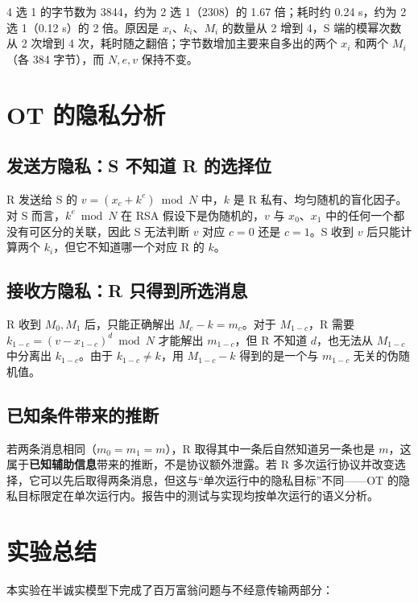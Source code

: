 \documentclass{SYSUReport}
\begin{document}
4 选 1 的字节数为 3844，约为 2 选 1（2308）的 1.67 倍；耗时约 0.24 s，约为 2 选 1（0.12 s）的 2 倍。原因是 $x_i$、$k_i$、$M_i$ 的数量从 2 增到 4，S 端的模幂次数从 2 次增到 4 次，耗时随之翻倍；字节数增加主要来自多出的两个 $x_i$ 和两个 $M_i$（各 384 字节），而 $N,e,v$ 保持不变。

\section{OT 的隐私分析}

\subsection{发送方隐私：S 不知道 R 的选择位}

R 发送给 S 的 $v=(x_c+k^e)\bmod N$ 中，$k$ 是 R 私有、均匀随机的盲化因子。对 S 而言，$k^e\bmod N$ 在 RSA 假设下是伪随机的，$v$ 与 $x_0$、$x_1$ 中的任何一个都没有可区分的关联，因此 S 无法判断 $v$ 对应 $c=0$ 还是 $c=1$。S 收到 $v$ 后只能计算两个 $k_i$，但它不知道哪一个对应 R 的 $k$。

\subsection{接收方隐私：R 只得到所选消息}

R 收到 $M_0,M_1$ 后，只能正确解出 $M_c-k=m_c$。对于 $M_{1-c}$，R 需要 $k_{1-c}=(v-x_{1-c})^d\bmod N$ 才能解出 $m_{1-c}$，但 R 不知道 $d$，也无法从 $M_{1-c}$ 中分离出 $k_{1-c}$。由于 $k_{1-c}\neq k$，用 $M_{1-c}-k$ 得到的是一个与 $m_{1-c}$ 无关的伪随机值。

\subsection{已知条件带来的推断}

若两条消息相同（$m_0=m_1=m$），R 取得其中一条后自然知道另一条也是 $m$，这属于\textbf{已知辅助信息}带来的推断，不是协议额外泄露。若 R 多次运行协议并改变选择，它可以先后取得两条消息，但这与“单次运行中的隐私目标”不同——OT 的隐私目标限定在单次运行内。报告中的测试与实现均按单次运行的语义分析。

\section{实验总结}

本实验在半诚实模型下完成了百万富翁问题与不经意传输两部分：
\end{document}
